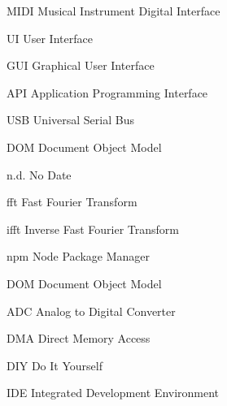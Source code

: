 \begin{acronyms}
  \item[MIDI] Musical Instrument Digital Interface
  \item[UI] User Interface
  \item[GUI] Graphical User Interface
  \item[API] Application Programming Interface
  \item[USB] Universal Serial Bus
  \item[DOM] Document Object Model
  \item[n.d.] No Date
  \item[fft] Fast Fourier Transform
  \item[ifft] Inverse Fast Fourier Transform
  \item[npm] Node Package Manager
  \item[DOM] Document Object Model
  \item[ADC] Analog to Digital Converter
  \item[DMA] Direct Memory Access
  \item[DIY] Do It Yourself
  \item[IDE] Integrated Development Environment
\end{acronyms}
